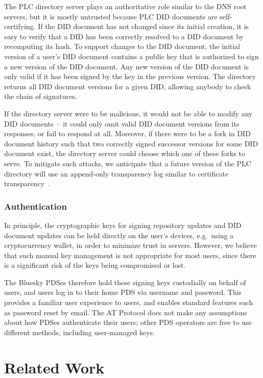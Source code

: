 \documentclass[sigconf]{acmart}
\newif\ifextendedversion
\begin{document}
The PLC directory server plays an authoritative role similar to the DNS root servers, but it is mostly untrusted because PLC DID documents are self-certifying.
If the DID document has not changed since its initial creation, it is easy to verify that a DID has been correctly resolved to a DID document by recomputing its hash.
To support changes to the DID document, the initial version of a user's DID document contains a public key that is authorized to sign a new version of the DID document.
Any new version of the DID document is only valid if it has been signed by the key in the previous version.
The directory returns all DID document versions for a given DID, allowing anybody to check the chain of signatures.

If the directory server were to be malicious, it would not be able to modify any DID documents~-- it could only omit valid DID document versions from its responses, or fail to respond at all.
Moreover, if there were to be a fork in DID document history such that two correctly signed successor versions for some DID document exist, the directory server could choose which one of these forks to serve.
To mitigate such attacks, we anticipate that a future version of the PLC directory will use an append-only transparency log similar to certificate transparency~\cite{Laurie:2014}.

\subsubsection{Authentication}

In principle, the cryptographic keys for signing repository updates and DID document updates can be held directly on the user's devices, e.g.\ using a cryptocurrency wallet, in order to minimize trust in servers.
However, we believe that such manual key management is not appropriate for most users, since there is a significant risk of the keys being compromised or lost.

The Bluesky PDSes therefore hold these signing keys custodially on behalf of users, and users log in to their home PDS via username and password.
This provides a familiar user experience to users, and enables standard features such as password reset by email.
The AT Protocol does not make any assumptions about how PDSes authenticate their users; other PDS operators are free to use different methods, including user-managed keys.

\ifextendedversion
\section{Related Work}\label{sec:related-work}
\end{document}
